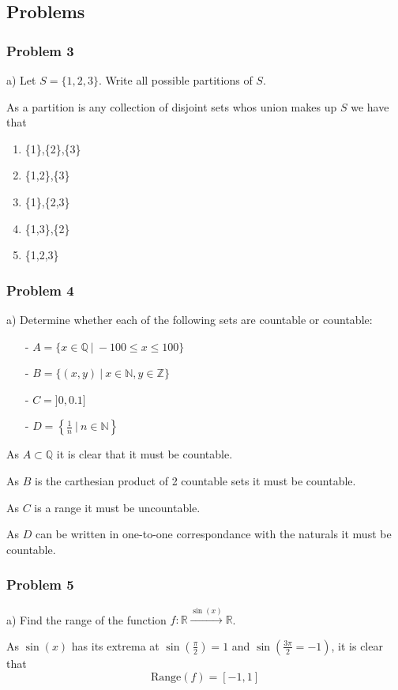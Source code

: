 \subsection{Problems}
\subsubsection{Problem 3}
a) Let $S=\{1,2,3\}$. Write all possible partitions of $S$.

As a partition is any collection of disjoint sets whos union makes up $S$ we have that
\begin{enumerate}
  \item \{1\},\{2\},\{3\}
  \item \{1,2\},\{3\}
  \item \{1\},\{2,3\}
  \item \{1,3\},\{2\}
  \item \{1,2,3\}
\end{enumerate}

\subsubsection{Problem 4}
a) Determine whether each of the following sets are countable or countable:
\begin{itemize}
    \item[-] $A=\{x\in \mathbb{Q}~|~-100\leq x\leq 100\}$
    \item[-] $B=\{(x,y)~|~x\in \mathbb{N},y \in \mathbb{Z}\}$
    \item[-] $C=]0,0.1]$
    \item[-] $D=\left\{\frac{1}{n}~|~n\in \mathbb{N}\right\}$
\end{itemize}

As $A\subset \mathbb{Q}$ it is clear that it must be countable.

As $B$ is the carthesian product of 2 countable sets it must be countable.

As $C$ is a range it must be uncountable.

As $D$ can be written in one-to-one correspondance with the naturals it must be countable.

\subsubsection{Problem 5}
a) Find the range of the function $f: \mathbb{R} \xrightarrow{\sin(x)} \mathbb{R}$. 

As $\sin(x)$ has its extrema at $\sin\left(\frac{\pi}{2}\right)=1$ and $\sin\left(\frac{3\pi}{2}=-1\right)$, it is clear that
\[
    \text{Range}(f)=[-1,1]
\]
